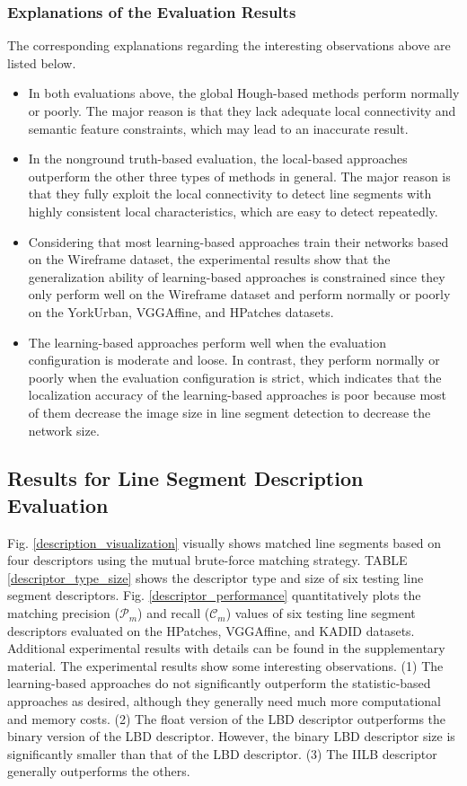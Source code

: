 \documentclass[journal,compsoc]{IEEEtran}
\begin{document}
\subsubsection{Explanations of the Evaluation Results}
The corresponding explanations regarding the interesting observations above are listed below.
\begin{itemize}
\item In both evaluations above, the global Hough-based methods perform normally or poorly. The major reason is that they lack adequate local connectivity and semantic feature constraints, which may lead to an inaccurate result.

\item In the nonground truth-based evaluation, the local-based approaches outperform the other three types of methods in general. The major reason is that they fully exploit the local connectivity to detect line segments with highly consistent local characteristics, which are easy to detect repeatedly.

\item Considering that most learning-based approaches train their networks based on the Wireframe dataset, the experimental results show that the generalization ability of learning-based approaches is constrained since they only perform well on the Wireframe dataset and perform normally or poorly on the YorkUrban, VGGAffine, and HPatches datasets.

\item The learning-based approaches perform well when the evaluation configuration is moderate and loose. In contrast, they perform normally or poorly when the evaluation configuration is strict, which indicates that the localization accuracy of the learning-based approaches is poor because most of them decrease the image size in line segment detection to decrease the network size.
\end{itemize}


\subsection{Results for Line Segment Description Evaluation}
Fig. \ref{description_visualization} visually shows matched line segments based on four descriptors using the mutual brute-force matching strategy. TABLE \ref{descriptor_type_size} shows the descriptor type and size of six testing line segment descriptors. Fig. \ref{descriptor_performance} quantitatively plots the matching precision ($\mathcal{P}_m$) and recall ($\mathcal{C}_m$) values of six testing line segment descriptors evaluated on the HPatches, VGGAffine, and KADID datasets. Additional experimental results with details can be found in the supplementary material. The experimental results show some interesting observations. (1) The learning-based approaches do not significantly outperform the statistic-based approaches as desired, although they generally need much more computational and memory costs. (2) The float version of the LBD descriptor outperforms the binary version of the LBD descriptor. However, the binary LBD descriptor size is significantly smaller than that of the LBD descriptor. (3) The IILB descriptor generally outperforms the others.
\end{document}
